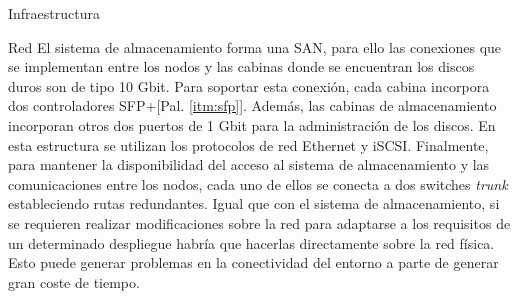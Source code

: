 \begin{section}{Infraestructura}
\begin{subsection}{Red}
    El sistema de almacenamiento forma una SAN, para ello las conexiones que se implementan entre los nodos y las cabinas donde se encuentran los discos duros son de tipo 10 Gbit. Para soportar esta conexión, cada cabina incorpora dos controladores SFP+[Pal. \ref{itm:sfp}]. Además, las cabinas de almacenamiento incorporan otros dos puertos de 1 Gbit para la administración de los discos. En esta estructura se utilizan los protocolos de red Ethernet y iSCSI. Finalmente, para mantener la disponibilidad del acceso al sistema de almacenamiento y las comunicaciones entre los nodos, cada uno de ellos se conecta a dos switches \textit{trunk} estableciendo rutas redundantes.
    Igual que con el sistema de almacenamiento, si se requieren realizar modificaciones sobre la red para adaptarse a los requisitos de un determinado despliegue habría que hacerlas directamente sobre la red física. Esto puede generar problemas en la conectividad del entorno a parte de generar gran coste de tiempo.

\end{subsection}

\end{section}

